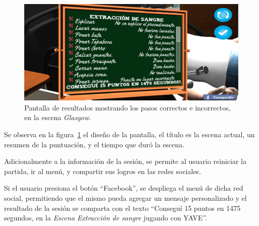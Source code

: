 \begin{figure}[H]
\centering
\includegraphics[scale=0.5]{solucion/images/resultado_hemocultivo.jpg}
\caption{Pantalla de resultados mostrando los pasos correctos e incorrectos, en
    la escena \emph{Glasgow}.}
\label{fig:resultados_glasgow}
\end{figure}

Se observa en la figura~\ref{fig:resultados_glasgow} el diseño de la
pantalla, el título es la escena actual, un resumen de la
puntuación, y el tiempo que duró la escena.

Adicionalmente a la información de la sesión, se permite al usuario reiniciar la
partida, ir al menú, y compartir sus logros en las redes sociales.

Si el usuario presiona el botón \enquote{Facebook}, se despliega el menú de
dicha red social, permitiendo que el mismo pueda agregar un mensaje
personalizado y el resultado de la sesión se comparta con el texto \enquote{Conseguí 15 puntos
    en 1475 segundos, en la \emph{Escena Extracción de sangre} jugando con
    YAVE}.

